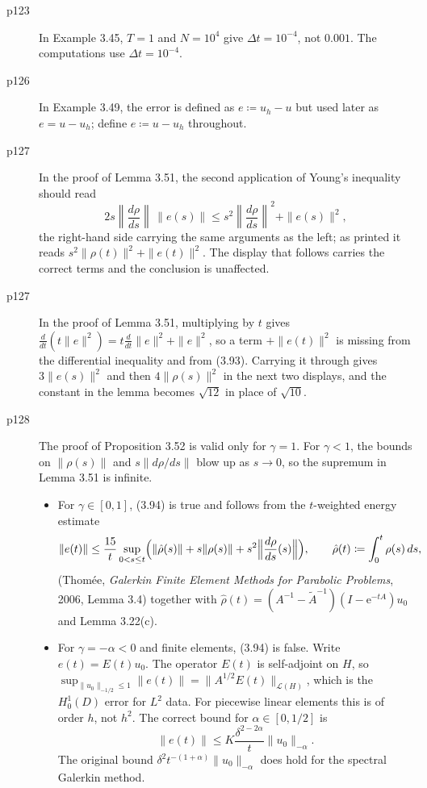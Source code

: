 \documentclass[final]{article}
\theoremstyle{definition}
\begin{document}
\begin{enumerate}
\begin{description}
   \item[p123] In Example 3.45, $T=1$ and $N=10^4$ give $\Delta t=10^{-4}$,
not $0.001$. The computations use $\Delta t=10^{-4}$.
   \item[p126] In Example 3.49, the error is defined as $e\coloneq u_h-u$ but
used later as $e=u-u_h$; define $e\coloneq u-u_h$ throughout.
   \item[p127] In the proof of Lemma 3.51, the second application of Young's
inequality should read
\[
2s\left\|\frac{d\rho}{ds}\right\|\,\|e(s)\| \le s^2\left\|\frac{d\rho}{ds}\right\|^2 + \|e(s)\|^2,
\]
the right-hand side carrying the same arguments as the left; as printed it reads
$s^2\|\rho(t)\|^2+\|e(t)\|^2$. The display that follows carries the correct
terms and the conclusion is unaffected.
   \item[p127] In the proof of Lemma 3.51, multiplying by $t$ gives
$\frac{d}{dt}(t\|e\|^2)=t\frac{d}{dt}\|e\|^2+\|e\|^2$, so a term $+\|e(t)\|^2$
is missing from the differential inequality and from (3.93). Carrying it
through gives $3\|e(s)\|^2$ and then $4\|\rho(s)\|^2$ in the next two displays,
and the constant in the lemma becomes $\sqrt{12}$ in place of $\sqrt{10}$.
   \item[p128] The proof of Proposition 3.52 is valid only for $\gamma=1$. For
$\gamma<1$, the bounds on $\|\rho(s)\|$ and $s\|d\rho/ds\|$ blow up as
$s\to0$, so the supremum in Lemma 3.51 is infinite.
\begin{itemize}
\item For $\gamma\in[0,1]$, (3.94) is true and follows from the $t$-weighted
energy estimate
\[
\|e(t)\|\le\frac{15}{t}\sup_{0<s\le t}\Bigl(\|\hat\rho(s)\|+s\|\rho(s)\|
+s^2\Bigl\|\frac{d\rho}{ds}(s)\Bigr\|\Bigr),\qquad
\hat\rho(t)\coloneq\int_0^t\rho(s)\,ds,
\]
(Thom\'ee, \emph{Galerkin Finite Element Methods for Parabolic Problems},
2006, Lemma 3.4) together with
$\hat\rho(t)=(A^{-1}-\tilde A^{-1})(I-\mathrm{e}^{-tA})u_0$ and Lemma 3.22(c).
\item For $\gamma=-\alpha<0$ and finite elements, (3.94) is false. Write
$e(t)=E(t)u_0$. The operator $E(t)$ is self-adjoint on $H$, so
$\sup_{\|u_0\|_{-1/2}\le1}\|e(t)\|=\|A^{1/2}E(t)\|_{\mathcal{L}(H)}$, which is
the $H^1_0(D)$ error for $L^2$ data. For piecewise linear elements this is of
order $h$, not $h^2$. The correct bound for $\alpha\in[0,1/2]$ is
\[
\|e(t)\|\le K\frac{\delta^{2-2\alpha}}{t}\|u_0\|_{-\alpha}.
\]
The original bound $\delta^2t^{-(1+\alpha)}\|u_0\|_{-\alpha}$ does hold for the
spectral Galerkin method.
\end{itemize}

\end{description}
\end{enumerate}
\end{document}
